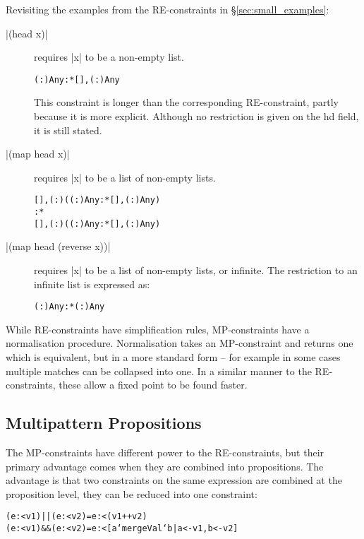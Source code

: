 \documentclass[preprint]{sigplanconf}
\newcommand{\C}[1]{\textsf{#1}}
\newenvironment{code}{\begin{alltt}\small}{\end{alltt}}
\begin{document}
Revisiting the examples from the RE-constraints in \S\ref{sec:small_examples}:

\begin{description}
\item[|(head x)|] requires |x| to be a non-empty list.

    \begin{code}
    {(:) Any} :* {[], (:) Any}
    \end{code}

    This constraint is longer than the corresponding RE-constraint, partly because it is more explicit. Although no restriction is given on the \C{hd} field, it is still stated.

\item[|(map head x)|] requires |x| to be a list of non-empty lists.

    \begin{code}
    {[], (:) ({(:) Any} :* {[], (:) Any})}
    :*
    {[], (:) ({(:) Any} :* {[], (:) Any})}
    \end{code}

\item[|(map head (reverse x))|] requires |x| to be a list of non-empty lists, or infinite. The restriction to an infinite list is expressed as:

    \begin{code}
    {(:) Any} :* {(:) Any}
    \end{code}
\end{description}

While RE-constraints have simplification rules, MP-constraints have a normalisation procedure. Normalisation takes an MP-constraint and returns one which is equivalent, but in a more standard form -- for example in some cases multiple matches can be collapsed into one. In a similar manner to the RE-constraints, these allow a fixed point to be found faster.

\subsection{Multipattern Propositions}

The MP-constraints have different power to the RE-constraints, but their primary advantage comes when they are combined into propositions. The advantage is that two constraints on the same expression are combined at the proposition level, they can be reduced into one constraint:

\begin{code}
(e :< v1) || (e :< v2) = e :< (v1 ++ v2)
(e :< v1) && (e :< v2) = e :< [a `mergeVal` b | a <- v1, b <- v2]
\end{code}
\end{document}
